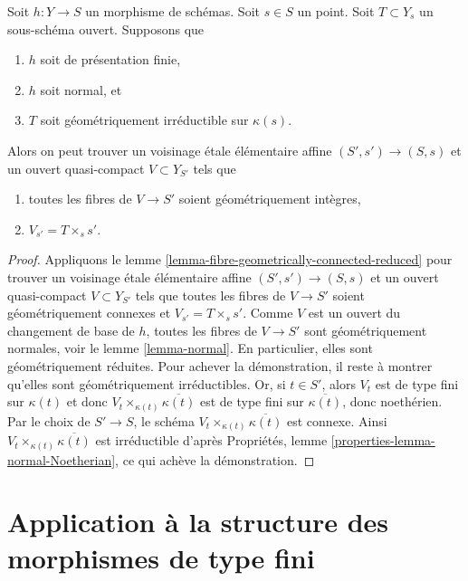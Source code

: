 \begin{lemma}
\label{lemma-normal-morphism-irreducible}
Soit $h : Y \to S$ un morphisme de schémas.
Soit $s \in S$ un point.
Soit $T \subset Y_s$ un sous-schéma ouvert.
Supposons que
\begin{enumerate}
\item $h$ soit de présentation finie,
\item $h$ soit normal, et
\item $T$ soit géométriquement irréductible sur $\kappa(s)$.
\end{enumerate}
Alors on peut trouver un voisinage \'etale élémentaire affine
$(S', s') \to (S, s)$ et un ouvert quasi-compact $V \subset Y_{S'}$ tels que
\begin{enumerate}
\item[(a)] toutes les fibres de $V \to S'$ soient géométriquement intègres,
\item[(b)] $V_{s'} = T \times_s s'$.
\end{enumerate}
\end{lemma}

\begin{proof}
Appliquons le
lemme \ref{lemma-fibre-geometrically-connected-reduced}
pour trouver un voisinage \'etale élémentaire affine $(S', s') \to (S, s)$ et
un ouvert quasi-compact $V \subset Y_{S'}$ tels que toutes les fibres de
$V \to S'$ soient géométriquement connexes et $V_{s'} = T \times_s s'$.
Comme $V$ est un ouvert du changement de base de $h$, toutes les fibres de $V \to S'$
sont géométriquement normales, voir le lemme \ref{lemma-normal}.
En particulier, elles sont géométriquement réduites. Pour achever la démonstration,
il reste à montrer qu'elles sont géométriquement irréductibles. Or, si $t \in S'$,
alors $V_t$ est de type fini sur $\kappa(t)$ et donc
$V_t \times_{\kappa(t)} \overline{\kappa(t)}$ est de type fini
sur $\overline{\kappa(t)}$, donc noethérien. Par le choix de $S' \to S$,
le schéma $V_t \times_{\kappa(t)} \overline{\kappa(t)}$ est connexe.
Ainsi $V_t \times_{\kappa(t)} \overline{\kappa(t)}$ est irréductible d'après
Propriétés, lemme \ref{properties-lemma-normal-Noetherian},
ce qui achève la démonstration.
\end{proof}








\section{Application à la structure des morphismes de type fini}
\label{section-application-finite-type}

